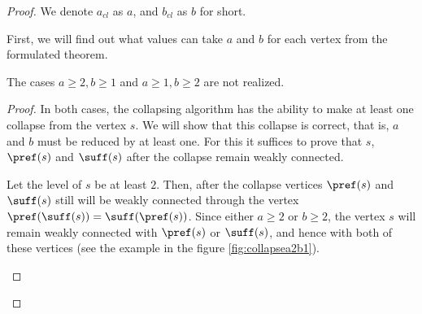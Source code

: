 \begin{proof}

We denote $ a_{cl} $ as $ a $, and $ b_{cl} $ as $ b $ for short. 
    
First, we will find out what values can take $ a $ and $ b $ for each vertex from the formulated theorem.
\begin{lemma}
\label{lem:edgecases}
The cases $a \ge 2, b \ge 1$ and $a \ge 1, b \ge 2$ are not realized.
\end{lemma}

\begin{proof}
In both cases, the collapsing algorithm has the ability to make at least one collapse from the vertex $ s $. We will show that this collapse is correct, that is, $ a $ and $ b $ must be reduced by at least one. For this it suffices to prove that $ s $, $ \pref (s) $ and $ \suff (s) $ after the collapse remain weakly connected.

Let the level of $ s $ be at least $ 2 $. Then, after the collapse vertices $ \pref(s) $ and $ \suff (s) $     still will be weakly connected through the vertex $ \pref (\suff (s)) = \suff (\pref (s)) $. Since either $ a \ge 2 $ or $ b \ge 2 $, the vertex $ s $ will remain weakly connected with $ \pref (s) $ or $ \suff (s) $, and hence with both of these vertices (see the example in the figure \ref{fig:collapsea2b1}).

\begin{figure}[ht]
\begin{center}

\end{center}
    

\end{figure}
\end{proof}
\end{proof}
